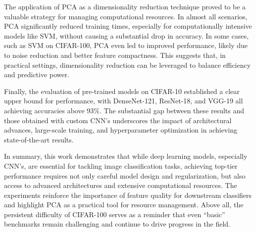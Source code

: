\documentclass[journal,article,submit,pdftex,moreauthors]{Definitions/mdpi}
\begin{document}
The application of PCA as a dimensionality reduction technique proved to be a valuable strategy for managing computational resources. In almost all scenarios, PCA significantly reduced training times, especially for computationally intensive models like SVM, without causing a substantial drop in accuracy. In some cases, such as SVM on CIFAR-100, PCA even led to improved performance, likely due to noise reduction and better feature compactness. This suggests that, in practical settings, dimensionality reduction can be leveraged to balance efficiency and predictive power.

Finally, the evaluation of pre-trained models on CIFAR-10 established a clear upper bound for performance, with DenseNet-121, ResNet-18, and VGG-19 all achieving accuracies above 93\%. The substantial gap between these results and those obtained with custom CNN's underscores the impact of architectural advances, large-scale training, and hyperparameter optimization in achieving state-of-the-art results.

In summary, this work demonstrates that while deep learning models, especially CNN's, are essential for tackling image classification tasks, achieving top-tier performance requires not only careful model design and regularization, but also access to advanced architectures and extensive computational resources. The experiments reinforce the importance of feature quality for downstream classifiers and highlight PCA as a practical tool for resource management. Above all, the persistent difficulty of CIFAR-100 serves as a reminder that even “basic” benchmarks remain challenging and continue to drive progress in the field.

\clearpage



\end{document}
